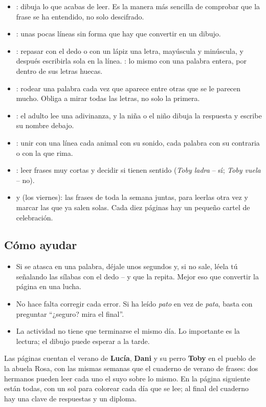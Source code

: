 {\small
\begin{itemize}[leftmargin=6mm, itemsep=1pt, topsep=2pt]
\item \textbf{\lblDibuja}: dibuja lo que acabas de leer. Es la manera
  más sencilla de comprobar que la frase se ha entendido, no solo
  descifrado.
\item \textbf{\lblCompleta}: unas pocas líneas sin forma que hay que
  convertir en un dibujo.
\item \textbf{\lblTraza}: repasar con el dedo o con un lápiz una letra,
  mayúscula y minúscula, y después escribirla sola en la línea.
  \textbf{\lblEscribe}: lo mismo con una palabra entera, por dentro de
  sus letras huecas.
\item \textbf{\lblEncuentra}: rodear una palabra cada vez que aparece
  entre otras que se le parecen mucho. Obliga a mirar todas las letras,
  no solo la primera.
\item \textbf{\lblAdivina}: el adulto lee una adivinanza, y la niña o
  el niño dibuja la respuesta y escribe su nombre debajo.
\item \textbf{\lblUne}: unir con una línea cada animal con su sonido,
  cada palabra con su contraria o con la que rima.
\item \textbf{\lblSiNo}: leer frases muy cortas y decidir si tienen
  sentido (\emph{Toby ladra} -- sí; \emph{Toby vuela} -- no).
\item \textbf{\lblRelee} y \textbf{\lblRepasa} (los viernes): las frases
  de toda la semana juntas, para leerlas otra vez y marcar las que ya
  salen solas. Cada diez páginas hay un pequeño cartel de celebración.
\end{itemize}}

\subsection*{Cómo ayudar}

{\small
\begin{itemize}[leftmargin=6mm, itemsep=1pt, topsep=2pt]
\item Si se atasca en una palabra, déjale unos segundos y, si no sale,
  léela tú señalando las sílabas con el dedo -- y que la repita. Mejor
  eso que convertir la página en una lucha.
\item No hace falta corregir cada error. Si ha leído \emph{pato} en vez
  de \emph{pata}, basta con preguntar ``¿seguro? mira el final''.
\item La actividad no tiene que terminarse el mismo día. Lo importante
  es la lectura; el dibujo puede esperar a la tarde.
\end{itemize}}

Las páginas cuentan el verano de \textbf{Lucía}, \textbf{Dani} y su
perro \textbf{Toby} en el pueblo de la abuela Rosa, con las mismas
semanas que el cuaderno de verano de frases: dos hermanos pueden leer
cada uno el suyo sobre lo mismo. En la página siguiente están todas, con
un sol para colorear cada día que se lee; al final del cuaderno hay una
clave de respuestas y un diploma.
\newpage
